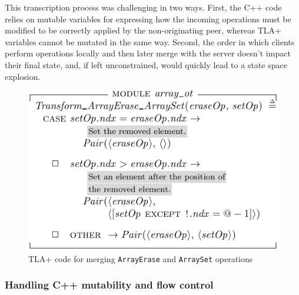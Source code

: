 \documentclass{vldb}
\begin{document}
This transcription process was challenging in two ways. First, the C++ code relies on mutable variables for expressing how the incoming operations must be modified to be correctly applied by the non-originating peer, whereas TLA+ variables cannot be mutated in the same way. Second, the order in which clients perform operations locally and then later merge with the server doesn't impact their final state, and, if left unconstrained, would quickly lead to a state space explosion.

\begin{figure}
\includegraphics{array_ot_merge_example.pdf}
\caption{TLA+ code for merging \texttt{ArrayErase} and \texttt{ArraySet} operations}
\label{fig:tlaplus_erase_set_merge}
\end{figure}

\subsubsection{Handling C++ mutability and flow control}
\end{document}
